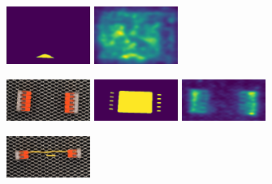 \begin{figure}[H]
\begin{subfigure}[b]{\textwidth}
\begin{minipage}{0.45\textwidth}
            \includegraphics[width=0.3\textwidth]{figures/appendix/appendix_RevDist/SB/008_mask.png}
            \includegraphics[width=0.3\textwidth]{figures/appendix/appendix_RevDist/SB/008m.png}
        \end{minipage}
    \end{subfigure}
    \hfill
    \begin{subfigure}[b]{\textwidth}
        \centering
        \begin{minipage}{0.45\textwidth}
            \centering
            \includegraphics[width=0.3\textwidth]{figures/appendix/appendix_RevDist/SC/021.png}
            \includegraphics[width=0.3\textwidth]{figures/appendix/appendix_RevDist/SC/021_mask.png}
            \includegraphics[width=0.3\textwidth]{figures/appendix/appendix_RevDist/SC/021m.png}
        \end{minipage}
        \begin{minipage}{0.45\textwidth}
            \centering
            \includegraphics[width=0.3\textwidth]{figures/appendix/appendix_RevDist/SC/045.png}

\end{minipage}
\end{subfigure}
\end{figure}
